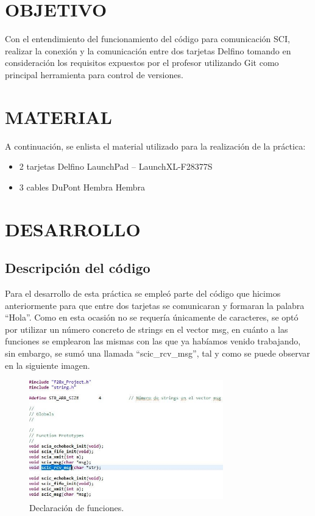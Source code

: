 \documentclass[12pt, letterpaper]{article}
\begin{document}
\section{OBJETIVO}

Con el entendimiento del funcionamiento del código para comunicación SCI, realizar la conexión y la comunicación entre dos tarjetas Delfino tomando en consideración los requisitos expuestos por el profesor utilizando Git como principal herramienta para control de versiones.

\section{MATERIAL}

A continuación, se enlista el material utilizado para la realización de la práctica:
\begin{itemize}
    \item 2 tarjetas Delfino LaunchPad – LaunchXL-F28377S
    \item 3 cables DuPont Hembra Hembra
\end{itemize}

\section{DESARROLLO}

\subsection{Descripción del código}
Para el desarrollo de esta práctica se empleó parte del código que hicimos anteriormente para que entre dos tarjetas se comunicaran y formaran la palabra “Hola”. Como en esta ocasión no se requería únicamente de caracteres, se optó por utilizar un número concreto de strings en el vector msg, en cuánto a las funciones se emplearon las mismas con las que ya habíamos venido trabajando, sin embargo, se sumó una llamada “scic\_rcv\_msg”, tal y como se puede observar en la siguiente imagen.

\begin{figure}[H]
    \centering
    \includegraphics[width=0.75\textwidth]{img/desarrollo/DES_1.jpg}
    \caption{Declaración de funciones.}
\end{figure}
\end{document}
